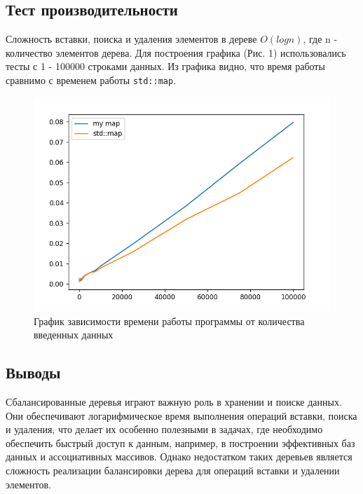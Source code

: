 \documentclass[12pt]{article}
\begin{document}
\newpage
\subsection*{Тест производительности}

Сложность вставки, поиска и удаления элементов в дереве $O(log n)$, где n - количество элементов дерева.
Для построения графика (Рис. 1) использовались тесты с 1 - 100000 строками данных.
Из графика видно, что время работы сравнимо с временем работы \texttt{std::map}.

\begin{figure}
    \centering
    \includegraphics[width=\textwidth]{graph.png}
    \caption{График зависимости времени работы программы от количества введенных данных}
\end{figure}

\newpage
\subsection*{Выводы}

Сбалансированные деревья играют важную роль в хранении и поиске данных. Они обеспечивают логарифмическое время выполнения операций
вставки, поиска и удаления, что делает их особенно полезными в задачах, где необходимо обеспечить быстрый доступ к данным,
например, в построении эффективных баз данных и ассоциативных массивов. Однако недостатком таких деревьев является сложность реализации
балансировки дерева для операций вставки и удалении элементов.
\end{document}
